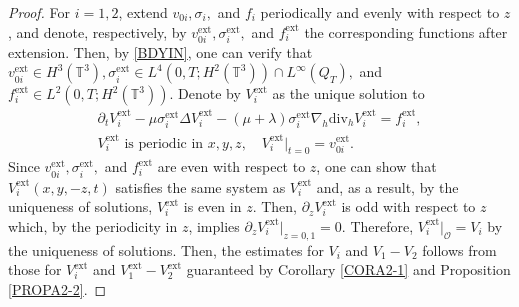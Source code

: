 \documentclass[12pt,reqno]{amsart}
\numberwithin{equation}{section}
\begin{document}
\begin{proof}
For $i=1,2$, extend $v_{0i}, \sigma_i,$ and $f_i$ periodically and evenly with respect to $z$, and denote, respectively, by $v_{0i}^\text{ext}, \sigma_i^\text{ext},$ and $f_i^\text{ext}$ the corresponding functions after extension. Then, by \eqref{BDYIN}, one can verify that $v_{0i}^\text{ext}\in H^3(\mathbb T^3), \sigma_i^\text{ext}\in L^4(0,T; H^2(\mathbb T^3))\cap L^\infty(Q_T),$ and $f_i^\text{ext}\in L^2(0,T; H^2(\mathbb T^3))$. Denote by
$V_i^\text{ext}$ as the unique solution to
  \begin{eqnarray*}
    \partial_tV_i^\text{ext}-\mu\sigma_i^\text{ext}\Delta V_i^\text{ext}-(\mu+\lambda)\sigma_i^\text{ext}\nabla_h\text{div}_hV_i^\text{ext}=f_i^\text{ext},\\
    V_i^\text{ext} \text{ is  periodic in }x,y,z,\quad     V_i^\text{ext}|_{t=0}=v_{0i}^\text{ext}.
  \end{eqnarray*}
Since $v_{0i}^\text{ext}, \sigma_i^\text{ext},$ and $f_i^\text{ext}$ are even with respect to $z$, one can show that $V_i^\text{ext}(x,y,-z,t)$ satisfies the same system as $V_i^\text{ext}$ and, as a result, by the uniqueness of solutions, $V_i^{\text{ext}}$ is even in $z$. Then, $\partial_zV_i^\text{ext}$ is odd with respect to $z$ which, by the periodicity in $z$, implies $\partial_zV_i^{\text{ext}}|_{z=0,1}=0$. Therefore, $V_i^\text{ext}|_{\mathcal O}=V_i$ by the uniqueness of solutions. Then, the estimates for $V_i$ and $V_1-V_2$ follows from those for $V_i^\text{ext}$ and $V_1^\text{ext}-V_2^\text{ext}$ guaranteed by Corollary \ref{CORA2-1} and Proposition \ref{PROPA2-2}.
\end{proof}
\end{document}
